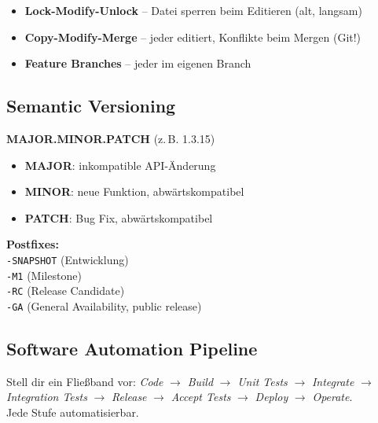 \documentclass[11pt,a4paper]{article}
\begin{document}
\begin{keyfacts}
\begin{itemize}
  \item \textbf{Lock-Modify-Unlock} -- Datei sperren beim Editieren (alt, langsam)
  \item \textbf{Copy-Modify-Merge} -- jeder editiert, Konflikte beim Mergen (Git!)
  \item \textbf{Feature Branches} -- jeder im eigenen Branch
\end{itemize}
\end{keyfacts}

\subsection{Semantic Versioning}

\begin{tldr}
\textbf{MAJOR.MINOR.PATCH} (z.\,B. 1.3.15)
\end{tldr}

\begin{keyfacts}
\begin{itemize}
  \item \textbf{MAJOR}: inkompatible API-Änderung
  \item \textbf{MINOR}: neue Funktion, abwärtskompatibel
  \item \textbf{PATCH}: Bug Fix, abwärtskompatibel
\end{itemize}
\end{keyfacts}

\begin{merkhilfe}
\textbf{Postfixes:}\\
\texttt{-SNAPSHOT} (Entwicklung)\\
\texttt{-M1} (Milestone)\\
\texttt{-RC} (Release Candidate)\\
\texttt{-GA} (General Availability, public release)
\end{merkhilfe}

\subsection{Software Automation Pipeline}

\begin{story}
Stell dir ein Fließband vor: \emph{Code} $\rightarrow$ \emph{Build} $\rightarrow$ \emph{Unit Tests} $\rightarrow$ \emph{Integrate} $\rightarrow$ \emph{Integration Tests} $\rightarrow$ \emph{Release} $\rightarrow$ \emph{Accept Tests} $\rightarrow$ \emph{Deploy} $\rightarrow$ \emph{Operate}.\\
Jede Stufe automatisierbar.
\end{story}
\end{document}

